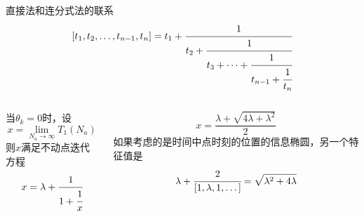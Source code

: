 \begin{frame}{直接法和连分式法的联系}
\[
[t_1,t_2,\dots,t_{n-1},t_n]=t_1+\cfrac{1}{t_2+\cfrac{1}{t_3+\dots+\cfrac{1}{t_{n-1}+\cfrac{1}{t_n}}}}
\]
\begin{columns}[c]
当$\theta_k=0$时，设
\[
x=\lim_{N_a\to \infty}T_1(N_a)
\]
则$x$满足不动点迭代方程
\[
x=\lambda+\cfrac{1}{1+\cfrac{1}{x}}
\]

\[
x=\frac{\lambda+\sqrt{4\lambda+\lambda^2}}{2}
\]
如果考虑的是时间中点时刻的位置的信息椭圆，另一个特征值是
\[
\lambda+\cfrac{2}{[1,\lambda,1,\dots]}=\sqrt{\lambda^2+4\lambda}
\]
\end{columns}
\end{frame}
%


